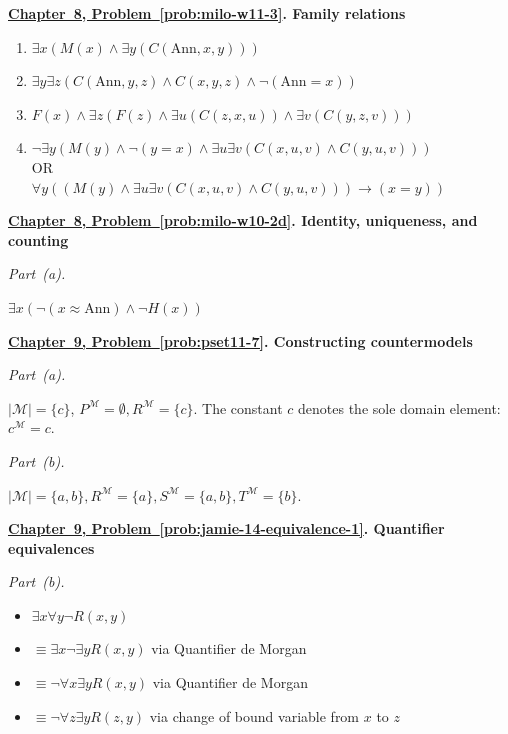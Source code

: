 \documentclass[11pt,letterpaper,oneside,openany]{book}
\newcounter{problem}[chapter]
\newcommand{\problemref}[2]{\hyperref[prob:#2]{Chapter~#1, Problem~\ref*{prob:#2}}}
\newcommand{\solutionheading}[3]{\par\addvspace{12pt}\Needspace{4\baselineskip}\textbf{\problemref{#1}{#2}. #3}\par\nobreak}
\begin{document}
\solutionheading{8}{milo-w11-3}{Family relations}
\begin{enumerate}[label=(\alph*)]
    \item $\exists x (M(x) \land \exists y (C(\text{Ann},x,y)))$
    \item $\exists y\exists z (C(\text{Ann},y,z) \land C(x,y,z) \land \neg(\text{Ann} = x))$
    \item $F(x) \land \exists z(F(z) \land \exists u(C(z,x,u)) \land \exists v(C(y,z,v)))$
    \item $\neg \exists y (M(y) \land \neg (y=x) \land \exists u \exists v (C(x,u,v) \land C(y, u,v)))$ \\
    \quad OR \\
    $\forall y ((M(y) \land \exists u\exists v (C(x,u,v) \land C(y,u,v))) \to (x=y))$
\end{enumerate}

\solutionheading{8}{milo-w10-2d}{Identity, uniqueness, and counting}
\par\medskip\noindent\textit{Part~(a).}\par\nobreak
$\exists x(\neg (x \approx \text{Ann}) \land \neg H(x))$

\solutionheading{9}{pset11-7}{Constructing countermodels}
\par\medskip\noindent\textit{Part~(a).}\par\nobreak
$|\mathcal{M}| = \{c\}$, $P^\mathcal{M} = \emptyset, R^\mathcal{M} = \{c\}$. The constant $c$ denotes the sole domain element: $c^{\mathcal{M}}=c$.

\par\medskip\noindent\textit{Part~(b).}\par\nobreak
$|\mathcal{M}| = \{a,b\}, R^\mathcal{M} = \{a\}, S^\mathcal{M} = \{a,b\}, T^\mathcal{M} = \{b\}$.

\solutionheading{9}{jamie-14-equivalence-1}{Quantifier equivalences}
\par\medskip\noindent\textit{Part~(b).}\par\nobreak
\begin{itemize}
        \item $\exists x \forall y \neg R(x,y)$
        \item $\equiv \exists x \neg \exists y R(x,y)$ via Quantifier de Morgan
        \item $\equiv \neg \forall x \exists y R(x,y)$ via Quantifier de Morgan
        \item $\equiv \neg \forall z \exists y R(z,y)$ via change of bound variable from $x$ to $z$
    \end{itemize}
\end{document}
